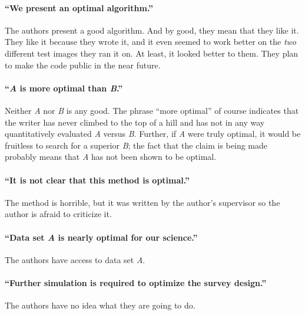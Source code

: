 \documentclass[12pt, preprint]{aastex}
\begin{document}
\paragraph{``We present an optimal algorithm.''}
The authors present a good algorithm.  And by good, they
mean that they like it.  They like it because they wrote it, and it
even seemed to work better on the \emph{two} different test images
they ran it on.  At least, it looked better to them.  They plan
to make the code public in the near future.



\paragraph{``\emph{A} is more optimal than \emph{B}.''}
Neither \emph{A} nor \emph{B} is any good.  The phrase
``more optimal'' of course indicates that the writer has never climbed
to the top of a hill and has not in any way quantitatively evaluated
\emph{A} versus \emph{B}.  Further, if \emph{A} were truly optimal, it
would be fruitless to search for a superior \emph{B}; the fact that
the claim is being made probably means that \emph{A} has not been
shown to be optimal.

\paragraph{``It is not clear that this method is optimal.''}
The method is horrible, but it was written by the author's supervisor
so the author is afraid to criticize it.


\paragraph{``Data set \emph{A} is nearly optimal for our science.''}
The authors have access to data set \emph{A}.


\paragraph{``Further simulation is required to optimize the survey design.''}
%
%
The authors have no idea what they are going to do.
\end{document}
